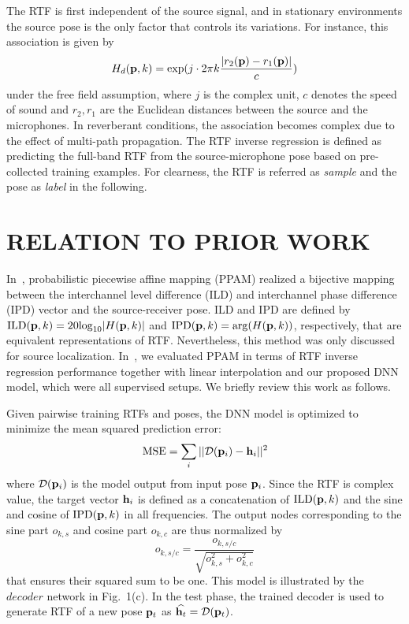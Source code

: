 \documentclass{article}
\begin{document}
The RTF is first independent of the source signal, and in stationary environments the source pose is the only factor that controls its variations. For instance, this association is given by
\begin{equation}\label{eq:green}
  H_d({\bf p},k)={\text{exp}(j\cdot 2\pi k \frac{|r_2({\bf p}) - r_1({\bf p})|}{c})}
\end{equation}
under the free field assumption, where $j$ is the complex unit, $c$ denotes the speed of sound and $r_{2}, r_{1}$ are the Euclidean distances between the source and the microphones. In reverberant conditions, the association becomes complex due to the effect of multi-path propagation. The RTF inverse regression is defined as predicting the full-band RTF from the source-microphone pose based on pre-collected training examples. For clearness, the RTF is referred as \emph{sample} and the pose as \emph{label} in the following.


\section{RELATION TO PRIOR WORK}

In~\cite{deleforge2015acoustic}, probabilistic piecewise affine mapping (PPAM) realized a bijective mapping between the interchannel level difference (ILD) and interchannel phase difference (IPD) vector and the source-receiver pose. ILD and IPD are defined by $\text{ILD}({\bf p}, k)=20{\rm log}_{10}|H({\bf p}, k)|$ and $\text{IPD}({\bf p}, k)={\rm arg}(H({\bf p}, k))$, respectively, that are equivalent representations of RTF. Nevertheless, this method was only discussed for source localization. In~\cite{rtfinv2017}, we evaluated PPAM in terms of RTF inverse regression performance together with linear interpolation and our proposed DNN model, which were all supervised setups. We briefly review this work as follows.

Given pairwise training RTFs and poses, the DNN model is optimized to minimize the mean squared prediction error:
\begin{equation}\label{eq:Dmmse}
  \text{MSE} = \sum_{i}||\mathcal{D}({\bf p}_i) - {\bf h}_i||^2
\end{equation}
where $\mathcal{D}({\bf p}_i)$ is the model output from input pose ${\bf p}_i$. Since the RTF is complex value, the target vector ${\bf h}_i$ is defined as a concatenation of $\text{ILD}({\bf p}, k)$ and the sine and cosine of $\text{IPD}({\bf p}, k)$ in all frequencies. The output nodes corresponding to the sine part $o_{k,s}$ and cosine part $o_{k,c}$ are thus normalized by
\begin{equation}\label{eq:ln}
  o_{k,s/c}=\frac{o_{k,s/c}}{\sqrt{o_{k,s}^2+o_{k,c}^2}}
\end{equation}
that ensures their squared sum to be one. This model is illustrated by the $decoder$ network in Fig.~1(c). In the test phase, the trained decoder is used to generate RTF of a new pose ${\bf p}_t$ as $\widehat{{\bf h}_t}=\mathcal{D}({\bf p}_t)$.
\end{document}
